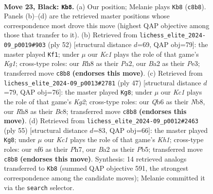 \documentclass[11pt]{article}
\begin{document}
\clearpage

\begin{figure}[p]\centering
\begin{subfigure}{0.46\textwidth}\centering
\resizebox{\linewidth}{!}{%
\newchessgame
\chessboard[
  setfen={r1k4r/p2Q1p1p/1qp2N2/8/3p4/3P4/b4PPP/2R3K1 b - - 5 23},
  showmover=false,
  pgfstyle=straightmove, color=movearrow, markmove={c8-b8}
]}
\caption{}
\end{subfigure}\hfill
\begin{subfigure}{0.46\textwidth}\centering
\resizebox{\linewidth}{!}{%
\newchessgame
\chessboard[
  setfen={3r3k/p4Bpp/8/8/N5n1/4PQP1/PP3P1q/2R3K1 w - - 0 27},
  showmover=false,
  pgfstyle=straightmove, color=movearrow, markmove={g1-f1}
]}
\caption{}
\end{subfigure}
\\[4pt]
\begin{subfigure}{0.46\textwidth}\centering
\resizebox{\linewidth}{!}{%
\newchessgame
\chessboard[
  setfen={rnbNq3/pp4kp/4pQp1/2P5/8/8/P1P3PP/5R1K b - - 1 24},
  showmover=false,
  pgfstyle=straightmove, color=movearrow, markmove={g7-g8}
]}
\caption{}
\end{subfigure}\hfill
\begin{subfigure}{0.46\textwidth}\centering
\resizebox{\linewidth}{!}{%
\newchessgame
\chessboard[
  setfen={1r5k/3q1p1p/3p1Q2/1p2p3/8/2P3P1/1P3P1P/3R2K1 b - - 1 28},
  showmover=false,
  pgfstyle=straightmove, color=movearrow, markmove={h8-g8}
]}
\caption{}
\end{subfigure}
\caption{\textbf{Move 23, Black: \texttt{Kb8}.} (a) Our position; Melanie plays \texttt{Kb8} (\texttt{c8b8}). Panels (b)--(d) are the retrieved master positions whose correspondence most drove this move (highest QAP objective among those that transfer to it). (b) Retrieved from \texttt{lichess\_elite\_2024-09\_p0019\#903} (ply 52) [structural distance $d$=69, QAP obj=79]: the master played \texttt{Kf1}; under $\mu$ our \emph{Kc1} plays the role of that game's \emph{Kg1}; cross-type roles: our \emph{R}h8 as their \emph{P}a2, our \emph{B}a2 as their \emph{P}e3; transferred move \texttt{c8b8} \textbf{(endorses this move)}. (c) Retrieved from \texttt{lichess\_elite\_2024-09\_p0013\#2781} (ply 47) [structural distance $d$=79, QAP obj=76]: the master played \texttt{Kg8}; under $\mu$ our \emph{Kc1} plays the role of that game's \emph{Kg2}; cross-type roles: our \emph{Q}b6 as their \emph{N}b8, our \emph{R}h8 as their \emph{B}c8; transferred move \texttt{c8b8} \textbf{(endorses this move)}. (d) Retrieved from \texttt{lichess\_elite\_2024-09\_p0012\#2463} (ply 55) [structural distance $d$=83, QAP obj=66]: the master played \texttt{Kg8}; under $\mu$ our \emph{Kc1} plays the role of that game's \emph{Kh1}; cross-type roles: our \emph{n}f6 as their \emph{P}h7, our \emph{B}a2 as their \emph{P}b5; transferred move \texttt{c8b8} \textbf{(endorses this move)}. Synthesis: 14 retrieved analogs transferred to \texttt{Kb8} (summed QAP objective 591, the strongest correspondence among the candidate moves); Melanie committed it via the \texttt{search} selector.}
\label{fig:thought-m45}
\end{figure}
\end{document}
